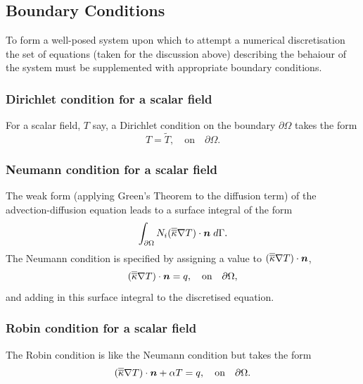 \subsection{Boundary Conditions}
\label{boundary_conditions_section}
To form a well-posed system upon which to attempt a numerical discretisation the set of equations (taken for the discussion above) describing the behaiour of the system must be supplemented with appropriate boundary conditions.


\subsubsection{Dirichlet condition for a scalar field}\label{sect:bc_scalar_dirichlet}
For a scalar field, $T$ say, a Dirichlet condition on the boundary $\partial\Omega$ takes the form
\begin{equation}
T=\tilde{T},\quad \textrm{on}\quad \partial\Omega.
\end{equation}


\subsubsection{Neumann condition for a scalar field}\label{sect:bc_scalar_neumann}
The weak form (applying Green's Theorem to the diffusion term) of the advection-diffusion equation leads to a surface integral of the form
\begin{equation}
\int_{\partial\Omega} N_i (\overline{\overline{\kappa}}\nabla T)\cdot{\mbox{\boldmath$n$}} \;d\Gamma.
\end{equation}
The Neumann condition is specified by assigning a value to $(\overline{\overline{\kappa}}\nabla T)\cdot{\mbox{\boldmath$n$}}$, \eg
\begin{equation}
(\overline{\overline{\kappa}}\nabla T)\cdot{\mbox{\boldmath$n$}} = q,\quad \textrm{on}\quad \partial\Omega,
\end{equation}
and adding in this surface integral to the discretised equation.


\subsubsection{Robin condition for a scalar field}\label{sect:bc_scalar_robin}
The Robin condition is like the Neumann condition but takes the form
\begin{equation}
(\overline{\overline{\kappa}}\nabla T)\cdot{\mbox{\boldmath$n$}} + \alpha T = q,\quad \textrm{on}\quad \partial\Omega.
\end{equation}

